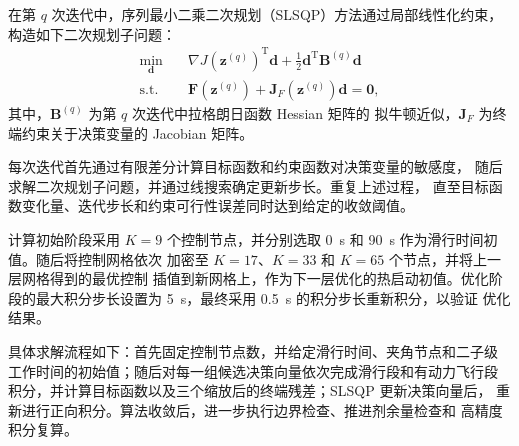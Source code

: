 \documentclass{JXUSTmodeling}
\begin{document}
在第 $q$ 次迭代中，序列最小二乘二次规划（SLSQP）方法通过局部线性化约束，
构造如下二次规划子问题：
\begin{equation}
	\begin{aligned}
		\underset{\mathbf{d}}{\min}
		\quad
		&
		\nabla J\left(\mathbf{z}^{(q)}\right)^{\mathrm{T}}\mathbf{d}
		+
		\frac{1}{2}
		\mathbf{d}^{\mathrm{T}}
		\mathbf{B}^{(q)}
		\mathbf{d} \\
		\text{s.t.}
		\quad
		&
		\mathbf{F}\left(\mathbf{z}^{(q)}\right)
		+
		\mathbf{J}_F\left(\mathbf{z}^{(q)}\right)\mathbf{d}
		=
		\mathbf{0},
	\end{aligned}
	\label{eq:slsqp_subproblem}
\end{equation}
其中，$\mathbf{B}^{(q)}$ 为第 $q$ 次迭代中拉格朗日函数 Hessian 矩阵的
拟牛顿近似，$\mathbf{J}_F$ 为终端约束关于决策变量的 Jacobian 矩阵。

每次迭代首先通过有限差分计算目标函数和约束函数对决策变量的敏感度，
随后求解二次规划子问题，并通过线搜索确定更新步长。重复上述过程，
直至目标函数变化量、迭代步长和约束可行性误差同时达到给定的收敛阈值。

计算初始阶段采用 $K=9$ 个控制节点，并分别选取
\SI{0}{\second} 和 \SI{90}{\second} 作为滑行时间初值。随后将控制网格依次
加密至 $K=17$、$K=33$ 和 $K=65$ 个节点，并将上一层网格得到的最优控制
插值到新网格上，作为下一层优化的热启动初值。优化阶段的最大积分步长设置为
\SI{5}{\second}，最终采用 \SI{0.5}{\second} 的积分步长重新积分，以验证
优化结果。

具体求解流程如下：首先固定控制节点数，并给定滑行时间、夹角节点和二子级
工作时间的初始值；随后对每一组候选决策向量依次完成滑行段和有动力飞行段
积分，并计算目标函数以及三个缩放后的终端残差；SLSQP 更新决策向量后，
重新进行正向积分。算法收敛后，进一步执行边界检查、推进剂余量检查和
高精度积分复算。
\end{document}
